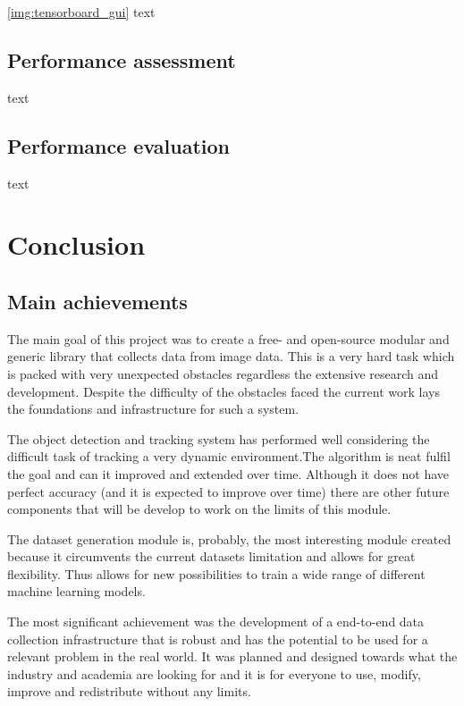 \documentclass[
    11pt,
    oneside
]{report}
\begin{document}
\ref{img:tensorboard_gui} text




\section{Performance assessment}


text



\section{Performance evaluation}


text




\chapter{Conclusion}



\section{Main achievements}

The main goal of this project was to create a free- and open-source modular and generic library that collects data from image data. This is a very hard task which is packed with very unexpected obstacles regardless the extensive research and development. Despite the difficulty of the obstacles faced the current work lays the foundations and infrastructure for such a system.


The object detection and tracking system has performed well considering the difficult task of tracking a very dynamic environment.The algorithm is neat fulfil the goal and can it improved and extended over time. Although it does not have perfect accuracy (and it is expected to improve over time) there are other future components that will be develop to work on the limits of this module.


The dataset generation module is, probably, the most interesting module created because it circumvents the current datasets limitation and allows for great flexibility. Thus allows for new possibilities to train a wide range of different machine learning models.


The most significant achievement was the development of a end-to-end data collection infrastructure that is robust and has the potential to be used for a relevant problem in the real world. It was planned and designed towards what the industry and academia are looking for and it is for everyone to use, modify, improve and redistribute without any limits.
\end{document}

